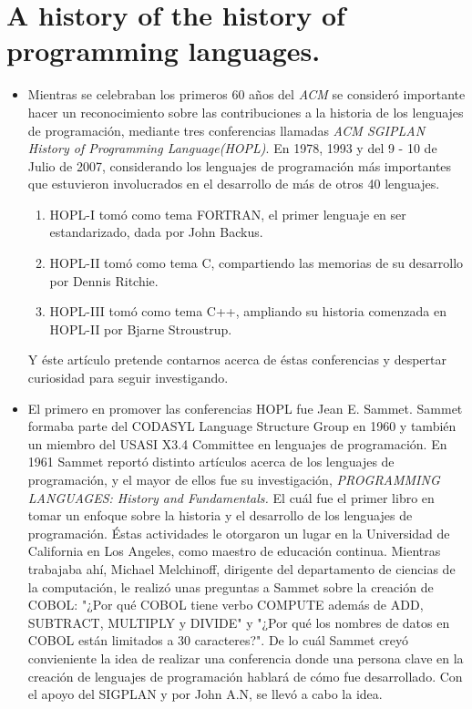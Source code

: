\documentclass{article}
\begin{document}
\section*{\LARGE{A history of the history of programming languages.}}

\begin{itemize}
	\item Mientras se celebraban los primeros 60 años del \textit{ACM} se consideró importante hacer un reconocimiento sobre las contribuciones a la historia de los lenguajes de programación, mediante tres conferencias llamadas \textit{ACM SGIPLAN History of Programming Language(HOPL)}. En 1978, 1993 y del 9 - 10 de Julio de 2007, considerando los lenguajes de programación más importantes que estuvieron involucrados en el desarrollo de más de otros 40 lenguajes.
		\begin{enumerate}
			\item HOPL-I tomó como tema FORTRAN, el primer lenguaje en ser estandarizado, dada por John Backus.
			\item HOPL-II tomó como tema C, compartiendo las memorias de su desarrollo por Dennis Ritchie.
			\item HOPL-III tomó como tema C++, ampliando su historia comenzada en HOPL-II por Bjarne Stroustrup.
		\end{enumerate}
	Y éste artículo pretende contarnos acerca de éstas conferencias y despertar curiosidad para seguir investigando.
	\item El primero en promover las conferencias HOPL fue Jean E. Sammet. Sammet formaba parte del CODASYL Language Structure Group en 1960 y también un miembro del USASI X3.4 Committee en lenguajes de programación. En 1961 Sammet reportó distinto artículos acerca de los lenguajes de programación, y el mayor de ellos fue su investigación, \textit{PROGRAMMING LANGUAGES: History and Fundamentals.} El cuál fue el primer libro en tomar un enfoque sobre la historia y el desarrollo de los lenguajes de programación. Éstas actividades le otorgaron un lugar en la Universidad de California en Los Angeles, como maestro de educación continua. Mientras trabajaba ahí, Michael Melchinoff, dirigente del departamento de ciencias de la computación, le realizó unas preguntas a Sammet sobre la creación de COBOL: "¿Por qué COBOL tiene verbo COMPUTE además de ADD, SUBTRACT, MULTIPLY y DIVIDE" y "¿Por qué los nombres de datos en COBOL están limitados a 30 caracteres?". De lo cuál Sammet creyó convieniente la idea de realizar una conferencia donde una persona clave en la creación de lenguajes de programación hablará de cómo fue desarrollado. Con el apoyo del SIGPLAN y por John A.N, se llevó a cabo la idea.

\end{itemize}
\end{document}

